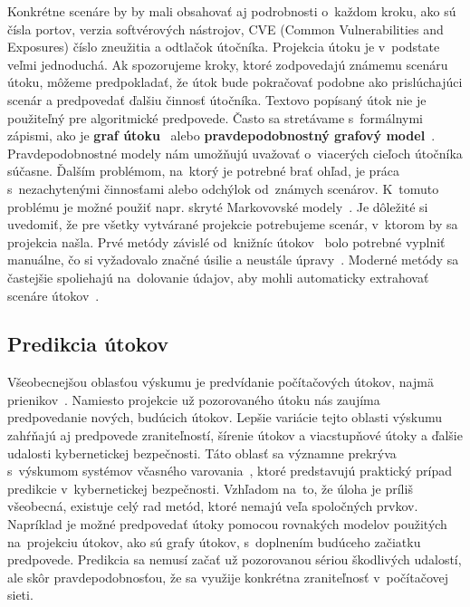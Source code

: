 \documentclass[thesismargins, thesislinespacing, openright, upjsfrontpage]{rnthesis}
\begin{document}
Konkrétne scenáre by by mali obsahovať aj podrobnosti o~každom kroku, ako sú čísla portov, verzia softvérových nástrojov, CVE (Common Vulnerabilities and Exposures) číslo zneužitia a odtlačok útočníka. Projekcia útoku je v~podstate veľmi jednoduchá. Ak spozorujeme kroky, ktoré zodpovedajú známemu scenáru útoku, môžeme predpokladať, že útok bude pokračovať podobne ako prislúchajúci scenár a predpovedať ďalšiu činnosť útočníka. Textovo popísaný útok nie je použiteľný pre algoritmické predpovede. Často sa stretávame s~formálnymi zápismi, ako je \textbf{graf útoku}~\cite{hughes2003attack} alebo \textbf{pravdepodobnostný grafový model}~\cite{qin2004attack}. Pravdepodobnostné modely nám umožňujú uvažovať o~viacerých cieľoch útočníka súčasne. Ďalším problémom, na~ktorý je potrebné brať ohľad, je práca s~nezachytenými činnosťami alebo odchýlok od~známych scenárov. K~tomuto problému je možné použiť napr. skryté Markovovské modely~\cite{farhadi2011alert}. Je dôležité si uvedomiť, že pre všetky vytvárané projekcie potrebujeme scenár, v~ktorom by sa projekcia našla. Prvé metódy závislé od~knižníc útokov~\cite{qin2004attack} bolo potrebné vyplniť manuálne, čo si vyžadovalo značné úsilie a neustále úpravy~\cite{Yang2014}. Moderné metódy sa častejšie spoliehajú na~dolovanie údajov, aby mohli automaticky extrahovať scenáre útokov~\cite{li2007data,farhadi2011alert,kim2014study}.

\subsection{Predikcia útokov}

Všeobecnejšou oblasťou výskumu je predvídanie počítačových útokov, najmä prienikov~\cite{Abdlhamed2017}. Namiesto projekcie už pozorovaného útoku nás zaujíma predpovedanie nových, budúcich útokov. Lepšie variácie tejto oblasti výskumu zahŕňajú aj predpovede zraniteľností, šírenie útokov a viacstupňové útoky a ďalšie udalosti kybernetickej bezpečnosti. Táto oblasť sa významne prekrýva s~výskumom systémov včasného varovania~\cite{ramaki2016survey}, ktoré predstavujú praktický prípad predikcie v~kybernetickej bezpečnosti. Vzhľadom na~to, že úloha je príliš všeobecná, existuje celý rad metód, ktoré nemajú veľa spoločných prvkov. Napríklad je možné predpovedať útoky pomocou rovnakých modelov použitých na~projekciu útokov, ako sú grafy útokov, s~doplnením budúceho začiatku predpovede. Predikcia sa nemusí začať už pozorovanou sériou škodlivých udalostí, ale skôr pravdepodobnosťou, že sa využije konkrétna zraniteľnosť v~počítačovej sieti. 
\end{document}
